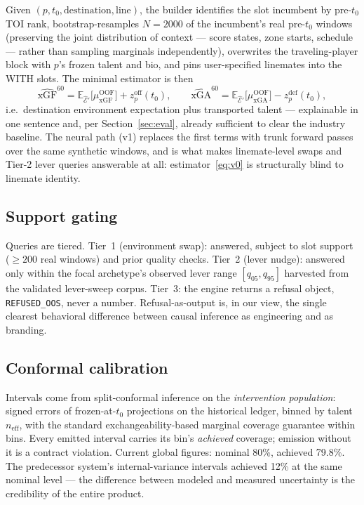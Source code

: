 \documentclass[11pt]{article}
\newcommand{\E}{\mathbb{E}}
\begin{document}
Given $(p, t_0, \text{destination}, \text{line})$, the builder identifies the slot
incumbent by pre-$t_0$ TOI rank, bootstrap-resamples $N{=}2000$ of the incumbent's real
pre-$t_0$ windows (preserving the joint distribution of context --- score states, zone
starts, schedule --- rather than sampling marginals independently), overwrites the
traveling-player block with $p$'s frozen talent and bio, and pins user-specified linemates
into the WITH slots. The minimal estimator is then
\begin{equation}
\widehat{\mathrm{xGF}}^{60} = \E_{\hat{\mathcal{E}}'}\big[\mu^{\mathrm{OOF}}_{\mathrm{xGF}}\big] + z^{\mathrm{off}}_p(t_0),
\qquad
\widehat{\mathrm{xGA}}^{60} = \E_{\hat{\mathcal{E}}'}\big[\mu^{\mathrm{OOF}}_{\mathrm{xGA}}\big] - z^{\mathrm{def}}_p(t_0),
\label{eq:v0}
\end{equation}
i.e.\ destination environment expectation plus transported talent --- explainable in one
sentence and, per Section~\ref{sec:eval}, already sufficient to clear the industry baseline.
The neural path (v1) replaces the first terms with trunk forward passes over the same
synthetic windows, and is what makes linemate-level swaps and Tier-2 lever queries
answerable at all: estimator~\eqref{eq:v0} is structurally blind to linemate identity.

\subsection{Support gating}\label{sec:support}

Queries are tiered. Tier~1 (environment swap): answered, subject to slot support
($\ge 200$ real windows) and prior quality checks. Tier~2 (lever nudge): answered only
within the focal archetype's observed lever range $[q_{05}, q_{95}]$ harvested from the
validated lever-sweep corpus. Tier~3: the engine returns a refusal object,
\texttt{REFUSED\_OOS}, never a number. Refusal-as-output is, in our view, the single
clearest behavioral difference between causal inference as engineering and as branding.

\subsection{Conformal calibration}\label{sec:conformal}

Intervals come from split-conformal inference on the \emph{intervention population}: signed
errors of frozen-at-$t_0$ projections on the historical ledger, binned by talent
$n_{\mathrm{eff}}$, with the standard exchangeability-based marginal coverage guarantee
within bins. Every emitted interval carries its bin's \emph{achieved} coverage; emission
without it is a contract violation. Current global figures: nominal 80\%, achieved 79.8\%.
The predecessor system's internal-variance intervals achieved 12\% at the same nominal
level --- the difference between modeled and measured uncertainty is the credibility of the
entire product.
\end{document}
